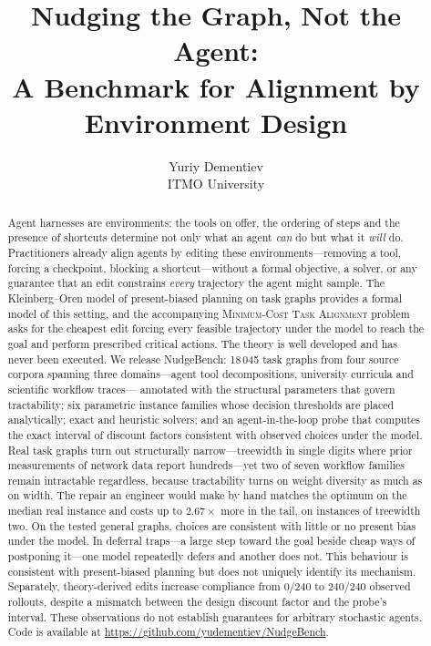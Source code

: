 \documentclass{article}
\title{Nudging the Graph, Not the Agent:\\
       A Benchmark for Alignment by Environment Design}
\author{Yuriy Dementiev\\
ITMO University}
\newcommand{\MCTA}{\textsc{Minimum-Cost Task Alignment}}
\begin{document}
\maketitle

\begin{abstract}
Agent harnesses are environments: the tools on offer, the ordering of steps and
the presence of shortcuts determine not only what an agent \emph{can} do but what
it \emph{will} do. Practitioners already align agents by editing these
environments---removing a tool, forcing a checkpoint, blocking a shortcut---without
a formal objective, a solver, or any guarantee that an edit constrains
\emph{every} trajectory the agent might sample. The Kleinberg--Oren model of
present-biased planning on task graphs provides a formal model of this setting, and the
accompanying \MCTA{} problem asks for the cheapest edit forcing every feasible
trajectory under the model to reach the goal and perform prescribed critical actions. The
theory is well developed and has never been executed. We release NudgeBench: 18\,045
task graphs from four source corpora spanning three domains---agent tool
decompositions, university curricula and scientific workflow traces---
annotated with the structural parameters that govern tractability; six parametric
instance families whose decision thresholds are placed analytically; exact and
heuristic solvers; and an agent-in-the-loop probe that computes the exact interval
of discount factors consistent with observed choices under the model. Real task graphs turn out structurally
narrow---treewidth in single digits where prior measurements of network data report
hundreds---yet two of seven workflow families remain intractable regardless,
because tractability turns on weight diversity as much as on width. The repair an
engineer would make by hand matches the optimum on the median real instance and
costs up to $2.67\times$ more in the tail, on instances of treewidth two. On
the tested general graphs, choices are consistent with little or no present bias
under the model. In deferral traps---a large step toward the goal beside cheap ways
of postponing it---one model repeatedly defers and another does not. This behaviour
is consistent with present-biased planning but does not uniquely identify its
mechanism. Separately, theory-derived edits increase compliance from $0/240$ to
$240/240$ observed rollouts, despite a mismatch between the design discount factor
and the probe's interval. These observations do not establish guarantees for
arbitrary stochastic agents.
Code is available at \mbox{\url{https://github.com/yudementiev/NudgeBench}}.
\end{abstract}
\end{document}
